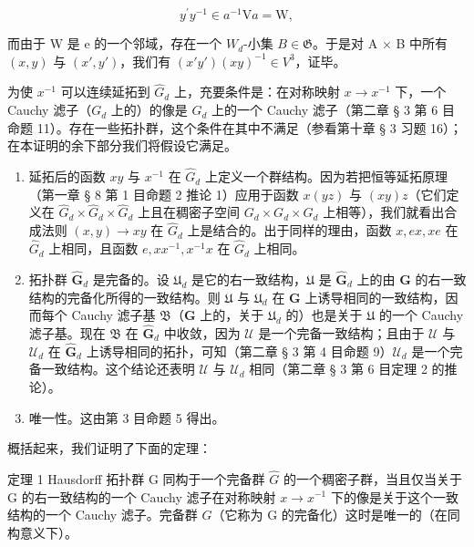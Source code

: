\[
y ^ {\prime} y ^ {- 1} \in a ^ {- 1} \mathrm{V}a = \mathrm{W},
\]

而由于 W 是 e 的一个邻域，存在一个 \(W_{d}\)-小集 \(B \in \mathfrak{G}\)。于是对 A × B 中所有 \((x, y)\) 与 \((x', y')\)，我们有 \((x'y')(xy)^{-1} \in V^{3}\)，证毕。

为使 \(x^{-1}\) 可以连续延拓到 \(\hat{G}_d\) 上，充要条件是：在对称映射 \(x \to x^{-1}\) 下，一个 Cauchy 滤子（\(G_d\) 上的）的像是 \(G_d\) 上的一个 Cauchy 滤子（第二章 § 3 第 6 目命题 11）。存在一些拓扑群，这个条件在其中不满足（参看第十章 § 3 习题 16）；在本证明的余下部分我们将假设它满足。

\begin{enumerate}
\def\labelenumi{\arabic{enumi})}
\setcounter{enumi}{1}
\item
  延拓后的函数 \(xy\) 与 \(x^{-1}\) 在 \(\hat{G}_d\) 上定义一个群结构。因为若把恒等延拓原理（第一章 § 8 第 1 目命题 2 推论 1）应用于函数 \(x(yz)\) 与 \((xy)z\)（它们定义在 \(\hat{G}_d \times \hat{G}_d \times \hat{G}_d\) 上且在稠密子空间 \(G_d \times G_d \times G_d\) 上相等），我们就看出合成法则 \((x, y) \to xy\) 在 \(\hat{G}_d\) 上是结合的。出于同样的理由，函数 \(x, ex, xe\) 在 \(\hat{G}_d\) 上相同，且函数 \(e, xx^{-1}, x^{-1}x\) 在 \(\hat{G}_d\) 上相同。
\item
  拓扑群 \(\hat{\mathbf{G}}_d\) 是完备的。设 \(\mathfrak{U}_d\) 是它的右一致结构，\(\mathfrak{U}\) 是 \(\hat{\mathbf{G}}_d\) 上的由 \(\mathbf{G}\) 的右一致结构的完备化所得的一致结构。则 \(\mathfrak{U}\) 与 \(\mathfrak{U}_d\) 在 \(\mathbf{G}\) 上诱导相同的一致结构，因而每个 Cauchy 滤子基 \(\mathfrak{B}\)（\(\mathbf{G}\) 上的，关于 \(\mathfrak{U}_d\) 的）也是关于 \(\mathfrak{U}\) 的一个 Cauchy 滤子基。现在 \(\mathfrak{B}\) 在 \(\hat{\mathbf{G}}_d\) 中收敛，因为 \(\mathcal{U}\) 是一个完备一致结构；且由于 \(\mathcal{U}\) 与 \(\mathcal{U}_d\) 在 \(\hat{\mathbf{G}}_d\) 上诱导相同的拓扑，可知（第二章 § 3 第 4 目命题 9）\(\mathcal{U}_d\) 是一个完备一致结构。这个结论还表明 \(\mathcal{U}\) 与 \(\mathcal{U}_d\) 相同（第二章 § 3 第 6 目定理 2 的推论）。
\item
  唯一性。这由第 3 目命题 5 得出。
\end{enumerate}

概括起来，我们证明了下面的定理：

定理 1 Hausdorff 拓扑群 G 同构于一个完备群 \(\hat{G}\) 的一个稠密子群，当且仅当关于 G 的右一致结构的一个 Cauchy 滤子在对称映射 \(x \to x^{-1}\) 下的像是关于这个一致结构的一个 Cauchy 滤子。完备群 \(\hat{G}\)（它称为 G 的完备化）这时是唯一的（在同构意义下）。

